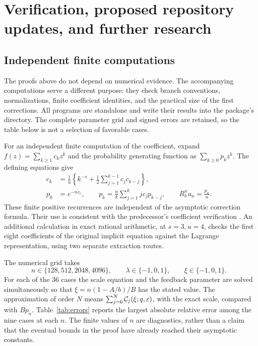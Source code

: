 \section{Verification, proposed repository updates, and further research}
\label{sec:verification}

\subsection{Independent finite computations}

The proofs above do not depend on numerical evidence. The accompanying
computations serve a different purpose: they check branch conventions,
normalizations, finite coefficient identities, and the practical size
of the first corrections. All programs are standalone and write their
results into the package's  directory. The complete parameter
grid and signed errors are retained, so the table below is not a
selection of favorable cases.

For an independent finite computation of the coefficient, expand
$f(z)=\sum_{k\ge1}c_kz^k$ and the probability generating function
as $\sum_{k\ge0}p_kz^k$. The defining equations give
\begin{align}
 c_k&=\frac1u\left\{k^{-s}
                  +\frac12\sum_{j=1}^{k-1}c_jc_{k-j}\right\},
                  \label{eq:recurrence-c}\\
 p_0&=e^{-nv_c},\qquad
 p_k=\frac nk\sum_{j=1}^k j c_jp_{k-j},\qquad
 R_b^n a_n=\frac{p_n}{n}.\label{eq:recurrence-p}
\end{align}
These finite positive recurrences are independent of the asymptotic
correction formula. Their use is consistent with the predecessor's
coefficient verification \cite{repo-boundary}. An additional calculation
in exact rational arithmetic, at $s=3,u=4$, checks the first eight
coefficients of the original implicit equation against the Lagrange
representation, using two separate extraction routes.

The numerical grid takes
\[
 n\in\{128,512,2048,4096\},\qquad
 \lambda\in\{-1,0,1\},\qquad \xi\in\{-1,0,1\}.
\]
For each of the 36 cases the scale equation and the feedback parameter
are solved simultaneously so that $\xi=n(1-A/b)/B$ has the stated
value. The approximation of order $N$ means
$\sum_{j=0}^N\mathcal C_j(\xi;q,\varepsilon)$, with the exact scale,
compared with $B p_n$. Table~\ref{tab:errors} reports the largest
absolute relative error among the nine cases at each $n$.
The finite values of $n$ are diagnostics, rather than a claim that
the eventual bounds in the proof have already reached their
asymptotic constants.


